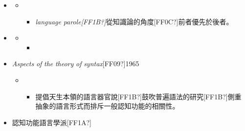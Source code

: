 \begin{itemize}
\item \begin{styleNormalWeb}
\end{styleNormalWeb}

\begin{itemize}
\item \begin{itemize}
\item \begin{styleNormalWeb}
\textit{language} \textit{parole[FF1B?]}從知識論的角度[FF0C?]前者優先於後者。
\end{styleNormalWeb}
\end{itemize}
\end{itemize}
\item \begin{styleNormalWeb}
\end{styleNormalWeb}

\begin{itemize}
\item \begin{itemize}
\item \begin{styleNormalWeb}
\end{styleNormalWeb}
\end{itemize}
\end{itemize}
\item \begin{styleNormalWeb}
\textit{Aspects} \textit{of} \textit{the} \textit{theory} \textit{of} \textit{syntax}[FF09?]1965
\end{styleNormalWeb}

\begin{itemize}
\item \begin{itemize}
\item \begin{styleNormalWeb}
提倡天生本領的語言器官說[FF1B?]鼓吹普遍語法的研究[FF1B?]側重抽象的語言形式而排斥一般認知功能的相關性。
\end{styleNormalWeb}
\end{itemize}
\end{itemize}
\item \begin{styleNormalWeb}
認知功能語言學派[FF1A?]  
\end{styleNormalWeb}
\end{itemize}

